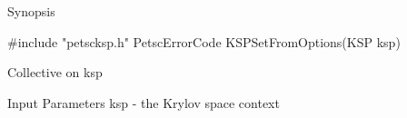 Synopsis

#include "petscksp.h"
PetscErrorCode  KSPSetFromOptions(KSP ksp)

Collective on ksp

Input Parameters
ksp - the Krylov space context
